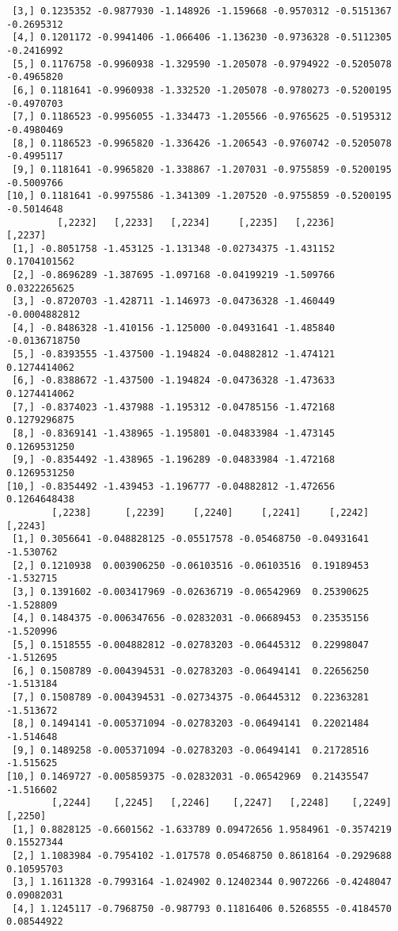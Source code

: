 \documentclass[
  letterpaper,
  DIV=11,
  numbers=noendperiod]{scrreprt}
\begin{document}
\begin{verbatim}
 [3,] 0.1235352 -0.9877930 -1.148926 -1.159668 -0.9570312 -0.5151367 -0.2695312
 [4,] 0.1201172 -0.9941406 -1.066406 -1.136230 -0.9736328 -0.5112305 -0.2416992
 [5,] 0.1176758 -0.9960938 -1.329590 -1.205078 -0.9794922 -0.5205078 -0.4965820
 [6,] 0.1181641 -0.9960938 -1.332520 -1.205078 -0.9780273 -0.5200195 -0.4970703
 [7,] 0.1186523 -0.9956055 -1.334473 -1.205566 -0.9765625 -0.5195312 -0.4980469
 [8,] 0.1186523 -0.9965820 -1.336426 -1.206543 -0.9760742 -0.5205078 -0.4995117
 [9,] 0.1181641 -0.9965820 -1.338867 -1.207031 -0.9755859 -0.5200195 -0.5009766
[10,] 0.1181641 -0.9975586 -1.341309 -1.207520 -0.9755859 -0.5200195 -0.5014648
         [,2232]   [,2233]   [,2234]     [,2235]   [,2236]       [,2237]
 [1,] -0.8051758 -1.453125 -1.131348 -0.02734375 -1.431152  0.1704101562
 [2,] -0.8696289 -1.387695 -1.097168 -0.04199219 -1.509766  0.0322265625
 [3,] -0.8720703 -1.428711 -1.146973 -0.04736328 -1.460449 -0.0004882812
 [4,] -0.8486328 -1.410156 -1.125000 -0.04931641 -1.485840 -0.0136718750
 [5,] -0.8393555 -1.437500 -1.194824 -0.04882812 -1.474121  0.1274414062
 [6,] -0.8388672 -1.437500 -1.194824 -0.04736328 -1.473633  0.1274414062
 [7,] -0.8374023 -1.437988 -1.195312 -0.04785156 -1.472168  0.1279296875
 [8,] -0.8369141 -1.438965 -1.195801 -0.04833984 -1.473145  0.1269531250
 [9,] -0.8354492 -1.438965 -1.196289 -0.04833984 -1.472168  0.1269531250
[10,] -0.8354492 -1.439453 -1.196777 -0.04882812 -1.472656  0.1264648438
        [,2238]      [,2239]     [,2240]     [,2241]     [,2242]   [,2243]
 [1,] 0.3056641 -0.048828125 -0.05517578 -0.05468750 -0.04931641 -1.530762
 [2,] 0.1210938  0.003906250 -0.06103516 -0.06103516  0.19189453 -1.532715
 [3,] 0.1391602 -0.003417969 -0.02636719 -0.06542969  0.25390625 -1.528809
 [4,] 0.1484375 -0.006347656 -0.02832031 -0.06689453  0.23535156 -1.520996
 [5,] 0.1518555 -0.004882812 -0.02783203 -0.06445312  0.22998047 -1.512695
 [6,] 0.1508789 -0.004394531 -0.02783203 -0.06494141  0.22656250 -1.513184
 [7,] 0.1508789 -0.004394531 -0.02734375 -0.06445312  0.22363281 -1.513672
 [8,] 0.1494141 -0.005371094 -0.02783203 -0.06494141  0.22021484 -1.514648
 [9,] 0.1489258 -0.005371094 -0.02783203 -0.06494141  0.21728516 -1.515625
[10,] 0.1469727 -0.005859375 -0.02832031 -0.06542969  0.21435547 -1.516602
        [,2244]    [,2245]   [,2246]    [,2247]   [,2248]    [,2249]    [,2250]
 [1,] 0.8828125 -0.6601562 -1.633789 0.09472656 1.9584961 -0.3574219 0.15527344
 [2,] 1.1083984 -0.7954102 -1.017578 0.05468750 0.8618164 -0.2929688 0.10595703
 [3,] 1.1611328 -0.7993164 -1.024902 0.12402344 0.9072266 -0.4248047 0.09082031
 [4,] 1.1245117 -0.7968750 -0.987793 0.11816406 0.5268555 -0.4184570 0.08544922

\end{verbatim}
\end{document}
